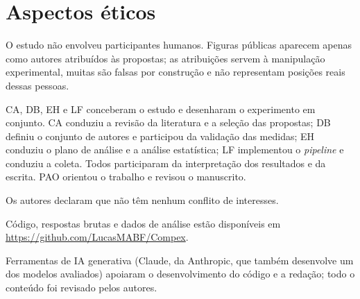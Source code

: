 \documentclass[portuguese]{sbc2025}
\begin{document}
\section*{Aspectos éticos}
O estudo não envolveu participantes humanos. Figuras públicas aparecem apenas
como autores atribuídos às propostas; as atribuições servem à manipulação
experimental, muitas são falsas por construção e não representam posições
reais dessas pessoas.

\begin{declarations}

\begin{contributions}
CA, DB, EH e LF conceberam o estudo e desenharam o experimento em conjunto. CA
conduziu a revisão da literatura e a seleção das propostas; DB definiu o
conjunto de autores e participou da validação das medidas; EH conduziu o plano
de análise e a análise estatística; LF implementou o \textit{pipeline} e
conduziu a coleta. Todos participaram da interpretação dos resultados e da
escrita. PAO orientou o trabalho e revisou o manuscrito.
\end{contributions}

\begin{interests}
Os autores declaram que não têm nenhum conflito de interesses.
\end{interests}

\begin{materials}
Código, respostas brutas e dados de análise estão disponíveis em
\url{https://github.com/LucasMABF/Compex}.
\end{materials}

\begin{furtherinformation}
Ferramentas de IA generativa (Claude, da Anthropic, que também desenvolve um dos
modelos avaliados) apoiaram o desenvolvimento do código e a redação; todo o
conteúdo foi revisado pelos autores.
\end{furtherinformation}
\end{declarations}



\end{document}
